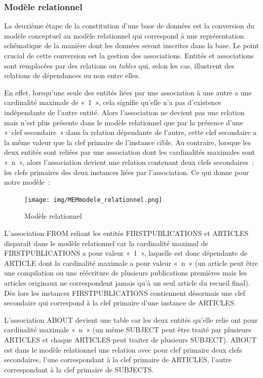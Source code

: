 \subsubsection{Modèle relationnel}
\label{ref:db_modele_relationnel}
La deuxième étape de la constitution d'une base de données est la conversion du modèle conceptuel au modèle relationnel qui correspond à une représentation schématique de la manière dont les données seront inscrites dans la base. Le point crucial de cette conversion est la gestion des associations. Entités et associations sont remplacées par des relations ou \textit{tables} qui, selon les cas, illustrent des relations de dépendances ou non entre elles.

En effet, lorsqu'une seule des entités liées par une association à une autre a une cardinalité maximale de «~1~», cela signifie qu'elle n'a pas d'existence indépendante de l'autre entité. Alors l'association ne devient pas une relation mais n'est plus présente dans le modèle relationnel que par la présence d'une «~clef secondaire~» dans la relation dépendante de l'autre, cette clef secondaire a la même valeur que la clef primaire de l'instance cible.
Au contraire, lorsque les deux entités sont reliées par une association dont les cardinalités maximales sont «~n~», alors l'association devient une relation contenant deux clefs secondaires~: les clefs primaires des deux instances liées par l'association. Ce qui donne pour notre modèle~:

\begin{figure}[H]
    \centering
    \texttt{[image: img/MEMmodele\_relationnel.png]}
    \caption{Modèle relationnel}
    \label{relationnel}
\end{figure}

L'association FROM reliant les entités FIRSTPUBLICATIONS et ARTICLES disparaît dans le modèle relationnel car la cardinalité maximal de FIRSTPUBLICATIONS a pour valeur «~1~», laquelle est donc dépendante de ARTICLE dont la cardinalité maximale a pour valeur «~n~» (un article peut être une compilation ou une réécriture de plusieurs publications premières mais les articles originaux ne correspondent jamais qu'à un seul article du recueil final). Dès lors les instances FIRSTPUBLICATIONS contiennent désormais une clef secondaire qui correspond à la clef primaire d'une instance de ARTICLES.

L'association ABOUT devient une table car les deux entités qu'elle relie ont pour cardinalité maximale «~n~» (un même SUBJECT peut être traité par plusieurs ARTICLES et chaque ARTICLES peut traiter de plusieurs SUBJECT). ABOUT est dans le modèle relationnel une relation avec pour clef primaire deux clefs secondaires, l'une correspondant à la clef primaire de ARTICLES, l'autre correspondant à la clef primaire de SUBJECTS.

